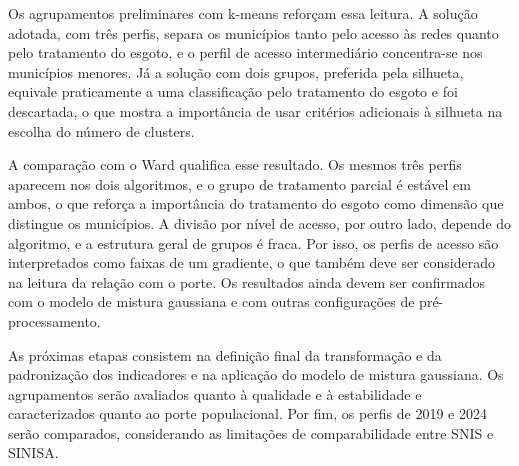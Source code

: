 \documentclass[12pt]{article}
\begin{document}
Os agrupamentos preliminares com k-means reforçam essa leitura. A solução adotada, com três
perfis, separa os municípios tanto pelo acesso às redes quanto pelo tratamento do esgoto, e o perfil
de acesso intermediário concentra-se nos municípios menores. Já a solução com dois grupos, preferida
pela silhueta, equivale praticamente a uma classificação pelo tratamento do esgoto e foi descartada,
o que mostra a importância de usar critérios adicionais à silhueta na escolha do número de clusters.

A comparação com o Ward qualifica esse resultado. Os mesmos três perfis aparecem nos dois
algoritmos, e o grupo de tratamento parcial é estável em ambos, o que reforça a importância do
tratamento do esgoto como dimensão que distingue os municípios. A divisão por nível de acesso, por
outro lado, depende do algoritmo, e a estrutura geral de grupos é fraca. Por isso, os perfis de
acesso são interpretados como faixas de um gradiente, o que também deve ser considerado na leitura da
relação com o porte. Os resultados ainda devem ser confirmados com o modelo de mistura gaussiana e com
outras configurações de pré-processamento.

As próximas etapas consistem na definição final da transformação e da padronização dos indicadores e
na aplicação do modelo de mistura gaussiana. Os agrupamentos serão
avaliados quanto à qualidade e à estabilidade e caracterizados quanto ao porte populacional. Por
fim, os perfis de 2019 e 2024 serão comparados, considerando as limitações de comparabilidade entre
SNIS e SINISA.



\end{document}
